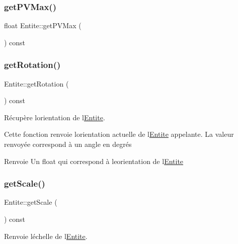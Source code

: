 \subsubsection{\texorpdfstring{get\+P\+V\+Max()}{getPVMax()}}
{\footnotesize\ttfamily float Entite\+::get\+P\+V\+Max (\begin{DoxyParamCaption}{ }\end{DoxyParamCaption}) const\hspace{0.3cm}{\ttfamily [inline]}}

\mbox{\label{class_entite_a7f19439f7e7a5028f4b26eff21683de9}} 
\subsubsection{\texorpdfstring{get\+Rotation()}{getRotation()}}
{\footnotesize\ttfamily Entite\+::get\+Rotation (\begin{DoxyParamCaption}{ }\end{DoxyParamCaption}) const}



Récupère l\textquotesingle{}orientation de l\textquotesingle{}\hyperlink{class_entite}{Entite}. 

Cette fonction renvoie l\textquotesingle{}orientation actuelle de l\textquotesingle{}\hyperlink{class_entite}{Entite} appelante. La valeur renvoyée correspond à un angle en degrés \begin{DoxyReturn}{Renvoie}
Un {\ttfamily float} qui correspond à l\textquotesingle{}eorientation de l\textquotesingle{}\hyperlink{class_entite}{Entite} 
\end{DoxyReturn}
\mbox{\label{class_entite_a5f70868f62049291edf4b245a531a6e0}} 
\subsubsection{\texorpdfstring{get\+Scale()}{getScale()}}
{\footnotesize\ttfamily Entite\+::get\+Scale (\begin{DoxyParamCaption}{ }\end{DoxyParamCaption}) const}



Renvoie l\textquotesingle{}échelle de l\textquotesingle{}\hyperlink{class_entite}{Entite}. 

